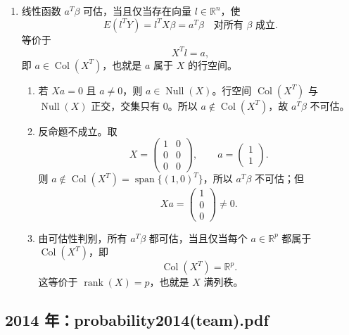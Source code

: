 \documentclass[UTF8,12pt]{ctexart}
\begin{document}
\begin{enumerate}[label=\textbf{\arabic*.},leftmargin=2.2em]
\item 线性函数 \(a^T\beta\) 可估，当且仅当存在向量 \(l\in\mathbb R^n\)，使
\[
E(l^TY)=l^TX\beta=a^T\beta\quad\text{对所有 }\beta\text{ 成立}.
\]
等价于
\[
X^Tl=a,
\]
即 \(a\in\operatorname{Col}(X^T)\)，也就是 \(a\) 属于 \(X\) 的行空间。
\begin{enumerate}[label=\textbf{(\alph*)},leftmargin=2.4em]
\item 若 \(Xa=0\) 且 \(a\ne0\)，则 \(a\in\operatorname{Null}(X)\)。行空间 \(\operatorname{Col}(X^T)\) 与 \(\operatorname{Null}(X)\) 正交，交集只有 \(0\)。所以 \(a\notin\operatorname{Col}(X^T)\)，故 \(a^T\beta\) 不可估。
\item 反命题不成立。取
\[
X=\begin{pmatrix}1&0\\0&0\\0&0\end{pmatrix},\qquad a=\begin{pmatrix}1\\1\end{pmatrix}.
\]
则 \(a\notin\operatorname{Col}(X^T)=\operatorname{span}\{(1,0)^T\}\)，所以 \(a^T\beta\) 不可估；但
\[
Xa=\begin{pmatrix}1\\0\\0\end{pmatrix}\ne0.
\]
\item 由可估性判别，所有 \(a^T\beta\) 都可估，当且仅当每个 \(a\in\mathbb R^p\) 都属于 \(\operatorname{Col}(X^T)\)，即
\[
\operatorname{Col}(X^T)=\mathbb R^p.
\]
这等价于 \(\operatorname{rank}(X)=p\)，也就是 \(X\) 满列秩。
\end{enumerate}
\end{enumerate}


\subsection{2014 年：probability2014(team).pdf}
\end{document}
